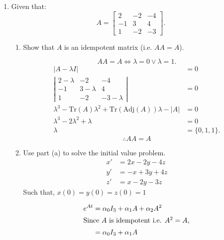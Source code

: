 \documentclass{zc-ust-hw}
\begin{document}
\begin{enumerate}
    \newpage

  \item Given that:
    \[
      A=\begin{bmatrix} 2&-2&-4\\-1&3&4\\1&-2&-3 \end{bmatrix} 
    .\] 

    \begin{enumerate}
      \item Show that \( A \) is an idempotent matrix (i.e. \( AA=A \)).
        \begin{sol}
          \begin{equation}
            A A = A \iff \lambda = 0 \lor \lambda = 1
          .\end{equation}
          \begin{align}
            |A - \lambda I| &= 0 \\
            \left|\begin{array}{ccc} 2-\lambda & -2 & -4 \\ -1 & 3-\lambda & 4 \\ 1 & -2 & -3-\lambda \end{array}\right| &= 0 \\
            \lambda^3 - \text{Tr}(A)\lambda^2 + \text{Tr}(\text{Adj}(A))\lambda - |A| &= 0 \\
            \lambda^3 - 2\lambda^2 +\lambda &= 0 \\
            \lambda &= \{0, 1, 1\}
          .\end{align}
          \begin{equation}
            \therefore A A = A
          \end{equation}
        \end{sol}
      \item Use part (a) to solve the initial value problem.
        \begin{align*}
          x'&=2x-2y-4z \\
          y'&=-x+3y+4z \\
          z'&=x-2y-3z
        \end{align*}
        Such that, \( x(0)=y(0)=z(0)=1 \)
        \begin{sol}
          \begin{align}
            e^{At} &= \alpha_{0} I_{3} + \alpha_{1} A + \alpha_{2} A^2 \\
            \intertext{Since \(A\) is idempotent i.e. \(A^2=A\),}
                   &= \alpha_{0} I_{3} + \alpha_{1} A \\

\end{align}
\end{sol}
\end{enumerate}
\end{enumerate}
\end{document}
